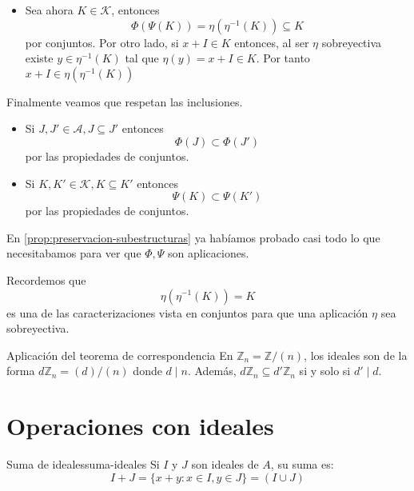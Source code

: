 \begin{proofbox}
\begin{itemize}
        \item Sea ahora $K \in \mathcal{K}$, entonces 
        \[
        \Phi(\Psi(K)) = \eta(\eta^{-1}(K)) \subseteq K
        \]
        por conjuntos. Por otro lado, si $x + I \in K$ entonces, al ser $\eta$ sobreyectiva existe $y \in \eta^{-1}(K)$ tal que $\eta(y) = x + I \in K$. Por tanto $x + I \in \eta(\eta^{-1}(K))$ 
    \end{itemize}

    Finalmente veamos que respetan las inclusiones.
    \begin{itemize}
        \item Si $J,J' \in \mathcal{A}, J \subseteq J'$ entonces
        \[
        \Phi(J) \subset \Phi(J')
        \]
        por las propiedades de conjuntos.
        \item Si $K, K' \in \mathcal{K}, K \subseteq K'$ entonces
        \[
        \Psi(K) \subset \Psi(K')
        \]
        por las propiedades de conjuntos.
    \end{itemize}
\end{proofbox}

\begin{remark}
    En \ref{prop:preservacion-subestructuras} ya habíamos probado casi todo lo que necesitabamos para ver que $\Phi, \Psi$ son aplicaciones.
\end{remark}

\begin{remark}
    Recordemos que
    \[
    \eta(\eta^{-1}(K)) = K
    \]
    es una de las caracterizaciones vista en conjuntos para que una aplicación $\eta$ sea sobreyectiva.
\end{remark}

\begin{example}{Aplicación del teorema de correspondencia}{}
    En \(\mathbb{Z}_n = \mathbb{Z}/(n)\), los ideales son de la forma \(d\mathbb{Z}_n = (d)/(n)\) donde \(d \mid n\). Además, \(d\mathbb{Z}_n \subseteq d'\mathbb{Z}_n\) si y solo si \(d' \mid d\).
\end{example}

\clearpage

\section{Operaciones con ideales}

\begin{definition}{Suma de ideales}{suma-ideales}
    Si \(I\) y \(J\) son ideales de \(A\), su {suma} es:
    \[
    I + J = \{x + y : x \in I, y \in J\} = (I \cup J)
    \]
\end{definition}


